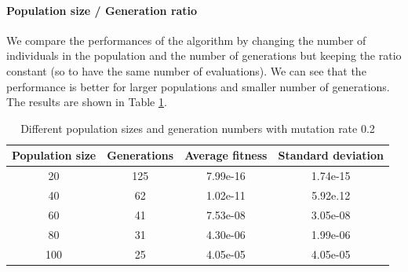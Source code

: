 \paragraph*{Population size / Generation ratio}
We compare the performances of the algorithm by changing the number of individuals in the population and the number of generations but keeping the ratio constant (so to have the same number of evaluations). We can see that the performance is better for larger populations and smaller number of generations. The results are shown in Table \ref{tab:pso-pop-gen}.
\begin{table}[H]
    \centering
    \begin{tabular}{|c|c|c|c|}
        Population size & Generations & Average fitness & Standard deviation \\ \hline
        20              & 125         & 7.99e-16        & 1.74e-15           \\
        40              & 62          & 1.02e-11        & 5.92e.12           \\
        60              & 41          & 7.53e-08        & 3.05e-08           \\
        80              & 31          & 4.30e-06        & 1.99e-06           \\
        100             & 25          & 4.05e-05        & 4.05e-05           \\
    \end{tabular}
    \caption{Different population sizes and generation numbers with mutation rate 0.2}
    \label{tab:pso-pop-gen}
\end{table}

